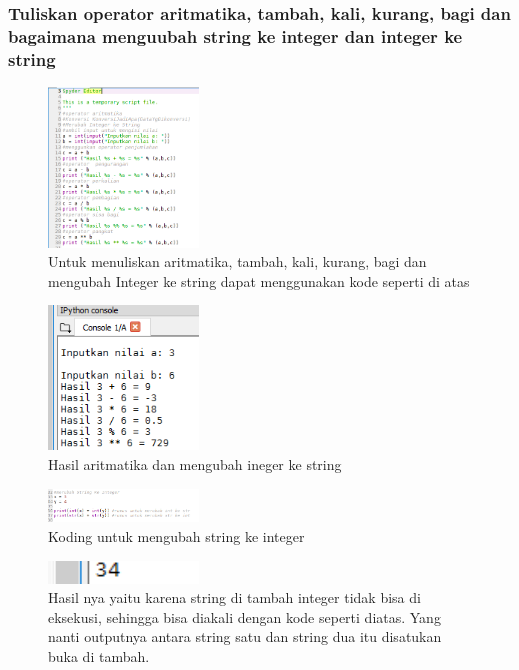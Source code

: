 \subsubsection{Tuliskan operator aritmatika, tambah, kali, kurang, bagi dan bagaimana menguubah string ke integer dan integer ke string}
\begin{figure}[H]
		\includegraphics[width=4cm]{figures/1184065/IntKeStr.PNG}
		\centering
		\caption{Untuk menuliskan aritmatika, tambah, kali, kurang, bagi dan mengubah Integer ke string dapat menggunakan kode seperti di atas}
\end{figure}
\begin{figure}[H]
		\includegraphics[width=4cm]{figures/1184065/IntKeStrHasil.PNG}
		\centering
		\caption{Hasil aritmatika dan mengubah ineger ke string}
\end{figure}
\begin{figure}[H]
		\includegraphics[width=4cm]{figures/1184065/StrKeIntNew.PNG}
		\centering
		\caption{Koding untuk mengubah string ke integer}
\end{figure}
\begin{figure}[H]
		\includegraphics[width=4cm]{figures/1184065/StrkeIntHasil.PNG}
		\centering
		\caption{Hasil nya yaitu karena string di tambah integer tidak bisa di eksekusi, sehingga bisa diakali dengan kode seperti diatas. Yang nanti outputnya antara string satu dan string dua itu disatukan buka di tambah.}
\end{figure}
